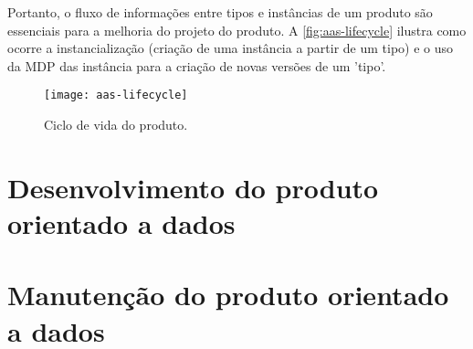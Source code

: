 	Portanto, o fluxo de informações entre tipos e instâncias de um produto são essenciais para a melhoria do projeto do produto. A \autoref{fig:aas-lifecycle} ilustra como ocorre a instancialização (criação de uma instância a partir de um tipo) e o uso da MDP das instância para a criação de novas versões de um 'tipo'.
	
	\begin{figure}[htb!]
		\centering
		\caption{Ciclo de vida do produto.}
		\label{fig:aas-lifecycle}
		\texttt{[image: aas-lifecycle]}
	\end{figure}


\section{Desenvolvimento do produto orientado a dados}

\lipsum[1-1]

\section{Manutenção do produto orientado a dados}

\lipsum[1-1]